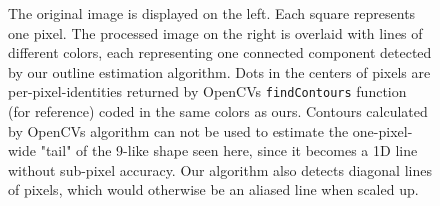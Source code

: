 \documentclass[9pt,lineno]{elife}
\begin{document}
\begin{figure}
\begin{subfigure}[b]{0.49\textwidth}
    \end{subfigure}
    \caption{The original image is displayed on the left. Each square represents one pixel. The processed image on the right is overlaid with lines of different colors, each representing one connected component detected by our outline estimation algorithm. Dots in the centers of pixels are per-pixel-identities returned by OpenCVs \texttt{findContours} function (for reference) coded in the same colors as ours.  Contours calculated by OpenCVs algorithm can not be used to estimate the one-pixel-wide "tail" of the 9-like shape seen here, since it becomes a 1D line without sub-pixel accuracy. Our algorithm also detects diagonal lines of pixels, which would otherwise be an aliased line when scaled up.}
	\label{fig:outline_approx}
\end{figure}
\end{document}
